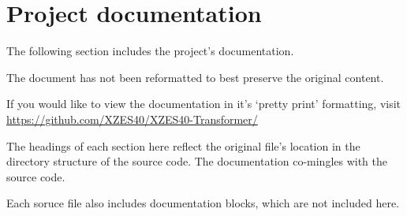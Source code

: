 \section{Project documentation}

The following section includes the project's documentation.

The document has not been reformatted to best preserve the original content.

If you would like to view the documentation in it's `pretty print' formatting, visit \url{https://github.com/XZES40/XZES40-Transformer/}

The headings of each section here reflect the original file's location in the directory structure of the source code.
The documentation co-mingles with the source code.

Each soruce file also includes documentation blocks, which are not included here.

















